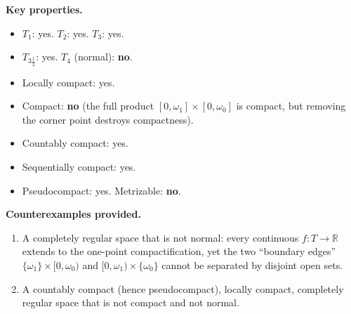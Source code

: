 \documentclass[11pt,a4paper,twoside]{book}
\theoremstyle{remark}
\theoremstyle{definition}
\theoremstyle{definition}
\begin{document}
\medskip
\textbf{Key properties.}
\begin{itemize}
  \item $T_1$: yes. \quad $T_2$: yes. \quad $T_3$: yes.
  \item $T_{3\frac{1}{2}}$: yes. \quad $T_4$ (normal): \textbf{no}.
  \item Locally compact: yes.
  \item Compact: \textbf{no} (the full product
        $[0,\omega_1]\times[0,\omega_0]$ is compact, but removing the
        corner point destroys compactness).
  \item Countably compact: yes.
  \item Sequentially compact: yes.
  \item Pseudocompact: yes. \quad Metrizable: \textbf{no}.
\end{itemize}

\textbf{Counterexamples provided.}
\begin{enumerate}
  \item A completely regular space that is not normal: every continuous
        $f\colon T\to\mathbb{R}$ extends to the one-point
        compactification, yet the two ``boundary edges''
        $\{\omega_1\}\times[0,\omega_0)$ and
        $[0,\omega_1)\times\{\omega_0\}$ cannot be separated by
        disjoint open sets.
  \item A countably compact (hence pseudocompact), locally compact,
        completely regular space that is not compact and not normal.
\end{enumerate}

\end{document}
